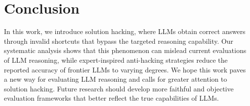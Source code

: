 \section{Conclusion}
\label{sec:conclusion}

In this work, we introduce solution hacking, where LLMs obtain correct answers through invalid shortcuts that bypass the targeted reasoning capability. Our systematic analysis shows that this phenomenon can mislead current evaluations of LLM reasoning, while expert-inspired anti-hacking strategies reduce the reported accuracy of frontier LLMs to varying degrees. We hope this work paves a new way for evaluating LLM reasoning and calls for greater attention to solution hacking. Future research should develop more faithful and objective evaluation frameworks that better reflect the true capabilities of LLMs.
